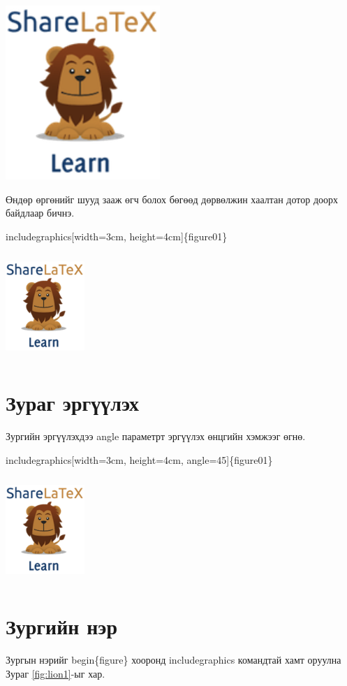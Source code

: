 \includegraphics[scale=0.9]{figure01}

Өндөр өргөнийг шууд зааж өгч болох бөгөөд дөрвөлжин хаалтан дотор доорх байдлаар бичнэ.
\begin{center}
	includegraphics[width=3cm, height=4cm]\{figure01\}
\end{center}
\includegraphics[width=3cm, height=4cm]{figure01}

\section{Зураг эргүүлэх}
Зургийн эргүүлэхдээ angle параметрт эргүүлэх өнцгийн хэмжээг өгнө.
\begin{center}
	includegraphics[width=3cm, height=4cm, angle=45]\{figure01\}
\end{center}
\includegraphics[width=3cm, height=4cm, angle=45]{figure01}

\section{Зургийн нэр}
Зургын нэрийг begin\{figure\} хооронд includegraphics командтай хамт оруулна Зураг \ref{fig:lion1}-ыг хар.

